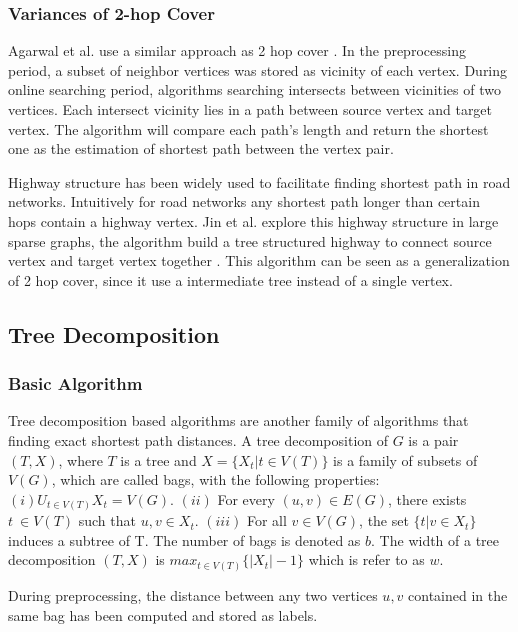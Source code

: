\subsubsection{Variances of 2-hop Cover}

Agarwal et al. use a similar approach as 2 hop cover \cite{Agarwal:2012:SPL:2342549.2342559}. In the preprocessing period, a subset of neighbor vertices was stored as vicinity of each vertex. During online searching period, algorithms searching intersects between vicinities of two vertices. Each intersect vicinity lies in a path between source vertex and target vertex. The algorithm will compare each path's length and return the shortest one as the estimation of shortest path between the vertex pair. 

Highway structure has been widely used to facilitate finding shortest path in road networks. Intuitively for road networks any shortest path longer than certain hops contain a highway vertex. Jin et al. explore this highway structure in large sparse graphs, the algorithm build a tree structured highway to connect source vertex and target vertex together \cite{Jin:2012:HLA:2213836.2213887}. This algorithm can be seen as a generalization of 2 hop cover, since it use a intermediate tree instead of a single vertex.

\subsection{Tree Decomposition}

\subsubsection{Basic Algorithm}

Tree decomposition based algorithms are another family of algorithms that finding exact shortest path distances. A tree decomposition of $G$ is a pair $(T,X)$, where $T$ is a tree and $X = \{X_t|t \in V(T)\}$ is a family of subsets of $V(G)$, which are called bags, with the following properties: $(i) U_{t \in V(T)}X_t = V(G)$. $(ii)$ For every $(u,v) \in E(G)$, there exists $t\ \in V(T)$ such that $u,v \in X_t$. $(iii)$ For all $v \in V(G)$, the set $\{t|v \in X_t\}$ induces a subtree of T. The number of bags is denoted as $b$. The width of a tree decomposition $(T, X)$ is $max_{t \in V(T)}\{|X_t|-1\}$ which is refer to as $w$.

During preprocessing, the distance between any two vertices $u,v$ contained in the same bag has been computed and stored as labels. 

